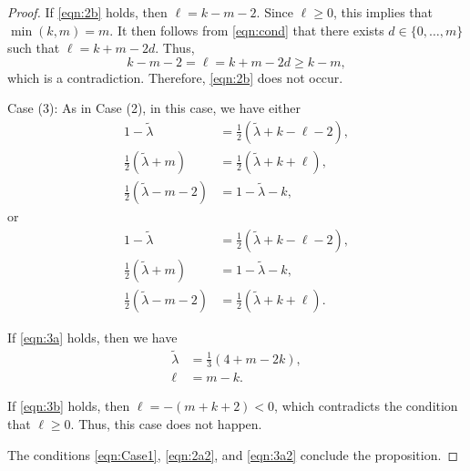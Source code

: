 \documentclass[10pt,a4paper]{amsart}
\newcommand{\wlambda}{\widetilde{\lambda}}
\begin{document}
\begin{proof}
If \eqref{eqn:2b} holds, then $\ell=k-m-2$. 
Since $\ell \geq 0$, this implies that $\min(k,m)=m$.
It then follows from \eqref{eqn:cond} that there exists $d \in \{0,\ldots, m\}$ such that
$\ell = k+m-2d$. Thus,
\begin{equation*}
k-m-2=\ell =k+m-2d \geq k-m,
\end{equation*}
which is a contradiction. Therefore, \eqref{eqn:2b} does not occur. 

\vskip 0.1in

\item 
Case (3): 
As in Case (2), in this case, we have either
\begin{equation}\label{eqn:3a}
\begin{aligned}
1-\wlambda &= \tfrac{1}{2}(\wlambda+k-\ell-2),\\
\tfrac{1}{2}(\wlambda+m) &=\tfrac{1}{2}(\wlambda+k+\ell),\\
\tfrac{1}{2}(\wlambda-m-2)&=1-\wlambda-k,
\end{aligned}
\end{equation}
or
\begin{equation}\label{eqn:3b}
\begin{aligned}
1-\wlambda &= \tfrac{1}{2}(\wlambda+k-\ell-2),\\
\tfrac{1}{2}(\wlambda+m)&=1-\wlambda-k,\\
\tfrac{1}{2}(\wlambda-m-2) &=\tfrac{1}{2}(\wlambda+k+\ell).
\end{aligned}
\end{equation}

If \eqref{eqn:3a} holds, then we have
\begin{equation}\label{eqn:3a2}
\begin{aligned}
\wlambda&=\frac{1}{3}(4+m-2k),\\
\ell&=m-k.
\end{aligned}
\end{equation}

If \eqref{eqn:3b} holds, then $\ell=-(m+k+2) < 0$, which contradicts 
the condition that  $\ell \geq 0$. 
Thus, this case does not happen.

The conditions \eqref{eqn:Case1}, \eqref{eqn:2a2},
and \eqref{eqn:3a2} conclude the proposition.
\end{proof}
\end{document}
